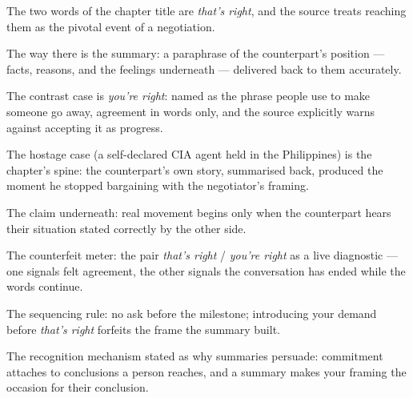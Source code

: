 

\begin{distilled}
  \item The two words of the chapter title are \emph{that's right}, and the source treats reaching them as the pivotal event of a negotiation.
  \item The way there is the summary: a paraphrase of the counterpart's position --- facts, reasons, and the feelings underneath --- delivered back to them accurately.
  \item The contrast case is \emph{you're right}: named as the phrase people use to make someone go away, agreement in words only, and the source explicitly warns against accepting it as progress.
  \item The hostage case (a self-declared CIA agent held in the Philippines) is the chapter's spine: the counterpart's own story, summarised back, produced the moment he stopped bargaining with the negotiator's framing.
  \item The claim underneath: real movement begins only when the counterpart hears their situation stated correctly by the other side.
\end{distilled}

\begin{unique}
  \item The counterfeit meter: the pair \emph{that's right} / \emph{you're right} as a live diagnostic --- one signals felt agreement, the other signals the conversation has ended while the words continue.
  \item The sequencing rule: no ask before the milestone; introducing your demand before \emph{that's right} forfeits the frame the summary built.
  \item The recognition mechanism stated as why summaries persuade: commitment attaches to conclusions a person reaches, and a summary makes your framing the occasion for their conclusion.
\end{unique}
